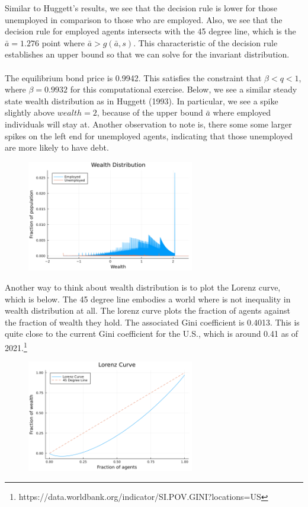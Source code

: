 \documentclass[12pt]{article}
\begin{document}
\noindent Similar to Huggett's results, we see that the decision rule is lower for those unemployed in comparison to those who are employed. Also, we see that the decision rule for employed agents intersects with the 45 degree line, which is the $\bar{a} = 1.276$ point where $\bar{a} > g(\bar{a}, s)$. This characteristic of the decision rule establishes an upper bound so that we can solve for the invariant distribution. \\\\
\clearpage
The equilibrium bond price is 0.9942. This satisfies the constraint that $\beta < q < 1$, where $\beta = 0.9932$ for this computational exercise. Below, we see a similar steady state wealth distribution as in Huggett (1993). In particular, we see a spike slightly above $wealth = 2$, because of the upper bound $\bar{a}$ where employed individuals will stay at. Another observation to note is, there some some larger spikes on the left end for unemployed agents, indicating that those unemployed are more likely to have debt. 

\begin{figure}[!htbp]
    \centering
    \includegraphics[width = 0.65\textwidth]{Wealth_Distribution.png}
    \label{fig:wealth}
\end{figure}

\noindent Another way to think about wealth distribution is to plot the Lorenz curve, which is below. The 45 degree line embodies a world where is not inequality in wealth distribution at all. The lorenz curve plots the fraction of agents against the fraction of wealth they hold. The associated Gini coefficient is 0.4013. This is quite close to the current Gini coefficient for the U.S., which is around 0.41 as of 2021.\footnote{https://data.worldbank.org/indicator/SI.POV.GINI?locations=US}

\begin{figure}[!htbp]
    \centering
    \includegraphics[width = 0.65\textwidth]{Lorenz_Curve.png}
    \label{fig:lorenz}
\end{figure}
\end{document}
